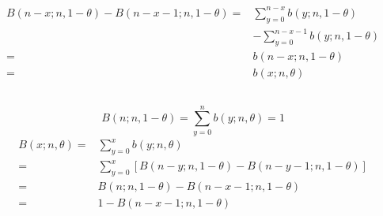 \documentclass{article}
\begin{document}
    \subsection{}
        \paragraph{
            \begin{equation*}
                \begin{split}
                    B(n-x;n,1-\theta)-B(n-x-1;n,1-\theta)=&\sum_{y=0}^{n-x}b(y;n,1-\theta)\\
                        &-\sum_{y=0}^{n-x-1}b(y;n,1-\theta)\\
                        =&b(n-x;n,1-\theta)\\
                        =&b(x;n,\theta)
                \end{split}
            \end{equation*}
        }
    \subsection{}
        \paragraph{
            $$B(n;n,1-\theta)=\sum_{y=0}^nb(y;n,\theta)=1$$
            \begin{equation*}
                \begin{split}
                    B(x;n,\theta)=&\sum_{y=0}^xb(y;n,\theta)\\
                        =&\sum_{y=0}^x[B(n-y;n,1-\theta)-B(n-y-1;n,1-\theta)]\\
                        =&B(n;n,1-\theta)-B(n-x-1;n,1-\theta)\\
                        =&1-B(n-x-1;n,1-\theta)\\
                \end{split}
            \end{equation*}
        }
\end{document}
